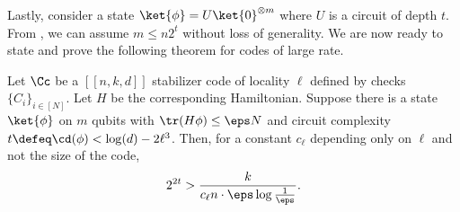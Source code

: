 \documentclass{toc}
\begin{document}
Lastly, consider a state $\ket{\phi}=U\ket{0}^{\otimes m}$ where $U$ is a circuit of depth $t$. From , we can assume $m\leq n 2^t$ without loss of generality. We are now ready to state and prove {the following theorem for codes of large rate.} %

\begin{theorem}
\label{thm:main-technical}
Let $\Cc$ be a $[[n,k,d]]$ stabilizer code of locality $\ell$ defined by checks $\{C_i\}_{i \in [N]}$. Let $H$ be the corresponding Hamiltonian. Suppose there is a state $\ket{\phi}$ on $m$ qubits with $\tr(H\phi) \leq \eps N$ and circuit complexity $t \defeq \cd(\phi) < \log(d) - 2 \ell^3$. Then, for a constant $c_\ell$ depending only on $\ell$ and not the size of the code,
\begin{align}
    2^{2t} > \frac{k}{c_\ell n \cdot \eps\log\frac{1}{\eps}}.
\end{align}
\end{theorem}
\end{document}
